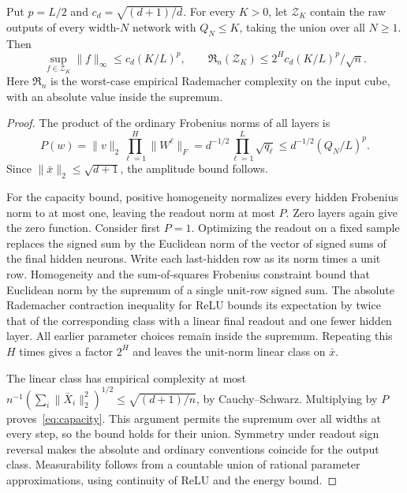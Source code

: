\documentclass[11pt]{article}
\theoremstyle{remark}\newtheorem{remark}[theorem]{Remark}
\newcommand{\Rad}{\mathfrak R}\newcommand{\KL}{\operatorname{KL}}
\begin{document}
\begin{lemma}
\label{lem:capacity}
Put $p=L/2$ and $c_d=\sqrt{(d+1)/d}$. For every $K>0$, let $\mathcal Z_K$ contain the raw outputs of every width-$N$ network with $Q_N\le K$, taking the union over all $N\ge1$. Then
\begin{equation}
 \sup_{f\in\mathcal Z_K}\|f\|_\infty\le c_d(K/L)^p,
 \qquad \Rad_n(\mathcal Z_K)\le
       2^Hc_d(K/L)^p/\sqrt n.
 \label{eq:capacity}
\end{equation}
Here $\Rad_n$ is the worst-case empirical Rademacher complexity on the input cube, with an absolute value inside the supremum.
\end{lemma}
\begin{proof}
The product of the ordinary Frobenius norms of all layers is
\[
 P(w)=\|v\|_2\prod_{\ell=1}^H\|W^\ell\|_F
   =d^{-1/2}\prod_{\ell=1}^L\sqrt{q_\ell}
   \le d^{-1/2}(Q_N/L)^p.
\]
Since $\|\bar x\|_2\le\sqrt{d+1}$, the amplitude bound follows.

For the capacity bound, positive homogeneity normalizes every hidden Frobenius norm to at most one, leaving the readout norm at most $P$. Zero layers again give the zero function. Consider first $P=1$. Optimizing the readout on a fixed sample replaces the signed sum by the Euclidean norm of the vector of signed sums of the final hidden neurons. Write each last-hidden row as its norm times a unit row. Homogeneity and the sum-of-squares Frobenius constraint bound that Euclidean norm by the supremum of a single unit-row signed sum. The absolute Rademacher contraction inequality for ReLU bounds its expectation by twice that of the corresponding class with a linear final readout and one fewer hidden layer. All earlier parameter choices remain inside the supremum. Repeating this $H$ times gives a factor $2^H$ and leaves the unit-norm linear class on $\bar x$.

The linear class has empirical complexity at most
$n^{-1}(\sum_i\|\bar X_i\|_2^2)^{1/2}\le\sqrt{(d+1)/n}$, by Cauchy--Schwarz. Multiplying by $P$ proves~\eqref{eq:capacity}. This argument permits the supremum over all widths at every step, so the bound holds for their union. Symmetry under readout sign reversal makes the absolute and ordinary conventions coincide for the output class. Measurability follows from a countable union of rational parameter approximations, using continuity of ReLU and the energy bound.
\end{proof}
\end{document}
